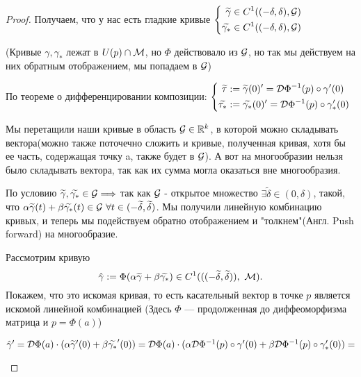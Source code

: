 \begin{proof}
Получаем, что у нас есть гладкие кривые $
\left\{ \begin{aligned} 
  \widetilde{\gamma} \in C^{1} ((-\delta, \delta), \mathcal{G}) \\
  \widetilde{\gamma_{*}} \in C^{1} ((-\delta, \delta), \mathcal{G})
\end{aligned} \right.
$



 (Кривые $\gamma, \gamma_{*}$ лежат в $U(p) \cap \mathcal{M}$, но $\Phi$ действовало из $\mathcal{G}$, но так мы действуем на них обратным отображением, мы попадаем в $\mathcal{G}$)

По теореме о дифференцировании композиции: $
\left\{ \begin{aligned} 
  \widetilde{\tau} &:= \widetilde{\gamma} (0)' = \mathcal{D} \Phi^{-1} (p) \circ \gamma' (0) \\
  \widetilde{\tau_{*}} &:= \widetilde{\gamma_{*}} (0)' = \mathcal{D} \Phi^{-1} (p) \circ \gamma_{*}' (0)
\end{aligned} \right.
$


Мы перетащили наши кривые в область $\mathcal{G} \in \mathbb{R}^k$, в которой можно складывать вектора(можно также поточечно сложить и кривые, полученная кривая, хотя бы ее часть, содержащая точку a, также будет в $\mathcal{G}$). А вот на многообразии нельзя было складывать вектора, так как их сумма могла оказаться вне многообразия.


По условию $\widetilde{\gamma}, \widetilde{\gamma_{*}} \in \mathcal{G} \Longrightarrow$ так как $\mathcal{G}$ - открытое множество $\exists \widetilde{\delta} \in (0, \delta)$, такой, что $\alpha \widetilde{\gamma}(t) + \beta \widetilde{\gamma_{*}}(t) \in \mathcal{G} \ \forall t \in (-\widetilde{\delta}, \widetilde{\delta})$. Мы получили линейную комбинацию кривых, и теперь мы подействуем обратно отображением и "толкнем"(Англ. Push forward) на многообразие.

Рассмотрим кривую $$\hat{\gamma} := \Phi (\alpha \widetilde{\gamma} + \beta \widetilde{\gamma_{*}}) \in C^1 (((-\widetilde{\delta}, \widetilde{\delta})), \ \mathcal{M} ).$$
Покажем, что это искомая кривая, то есть касательный вектор в точке $p$ является искомой линейной комбинацией (Здесь $\Phi$ — продолженная до диффеоморфизма матрица и $p = \Phi (a)$)


\begin{flushleft}
    $ \hat{\gamma}' = \mathcal{D} \Phi (a) \cdot (\alpha \widetilde{\gamma}'(0) + \beta \widetilde{\gamma_{*}}'(0)) =
\mathcal{D} \Phi (a) \cdot (\alpha \mathcal{D} \Phi^{-1} (p) \circ \gamma' (0) + \beta \mathcal{D} \Phi^{-1} (p) \circ \gamma_{*}' (0)) = $
\end{flushleft}


\end{proof}
